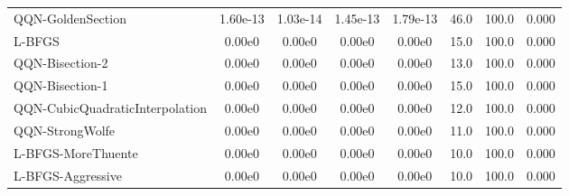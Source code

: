 \documentclass{article}
\begin{document}
\begin{table}[htbp]
{\begin{tabular}{p{2.5cm}*{7}{c}}
QQN-GoldenSection & 1.60e-13 & 1.03e-14 & 1.45e-13 & 1.79e-13 & 46.0 & 100.0 & 0.000 \\
L-BFGS & 0.00e0 & 0.00e0 & 0.00e0 & 0.00e0 & 15.0 & 100.0 & 0.000 \\
QQN-Bisection-2 & 0.00e0 & 0.00e0 & 0.00e0 & 0.00e0 & 13.0 & 100.0 & 0.000 \\
QQN-Bisection-1 & 0.00e0 & 0.00e0 & 0.00e0 & 0.00e0 & 15.0 & 100.0 & 0.000 \\
QQN-CubicQuadraticInterpolation & 0.00e0 & 0.00e0 & 0.00e0 & 0.00e0 & 12.0 & 100.0 & 0.000 \\
QQN-StrongWolfe & 0.00e0 & 0.00e0 & 0.00e0 & 0.00e0 & 11.0 & 100.0 & 0.000 \\
L-BFGS-MoreThuente & 0.00e0 & 0.00e0 & 0.00e0 & 0.00e0 & 10.0 & 100.0 & 0.000 \\
L-BFGS-Aggressive & 0.00e0 & 0.00e0 & 0.00e0 & 0.00e0 & 10.0 & 100.0 & 0.000 \\
\bottomrule
\end{tabular}
}
\end{table}
\end{document}
